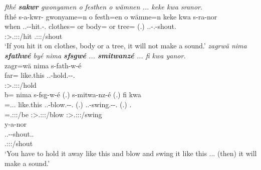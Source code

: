 \begin{exe}
\ex
\label{ex373}
\begin{xlist}
	\ex
	\emph{fthé \textbf{sakwr} gwonyamen o festhen o wämnen ... keke kwa sranor}.\\
	\glll fthé s-a-kwr-\Zero{} gwonyame=n o festh=en o wämne=n keke kwa s-ra-nor\\
	when \Tsg.\Masc.\Alph-\Ndu-hit.\Rs-\Ssg.\Imp{} clothes=\Loc{} or body=\Loc{} or tree=\Loc{} (.) \Neg{} \Fut{} \Tsg.\Masc.\Bet-\Irr.\Vc-shout.\Ext\\
	{} \footnotesize{\Fsg:\Sbj>\Tsg.\Masc:\Obj:\Imp:\Pfv/hit} {} {} {} {} {} {} {} {} \footnotesize{\Tsg.\Masc:\Sbj:\Irr:\Ipfv/shout}\\
	\trans `If you hit it on clothes, body or a tree, it will not make a sound.'
	\label{ex372}
	\ex
	\emph{zagrwä nima \textbf{sfathwé} byé nima \textbf{sfsgwé} ... \textbf{smitwanzé} ... fi kwa yanor.}\\
	\glll zagr=wä nima s-fath-w-é\\
	far=\Emph{} like.this \Tsg.\Masc.\Bet-hold.\Ext-\Ndu-\Ssg.\Imp{}\\
	{} {} \footnotesize{\Ssg:\Sbj>\Tsg.\Masc:\Obj:\Imp:\Ipfv/hold}\\
	\sn
	\glll b= nima s-fsg-w-é (.) s-mitwa-nz-é (.) fi kwa\\
	\Med=\Tsg.\Masc.\Cop.\Ndu{} like.this \Tsg.\Masc.\Bet-blow.\Ext-\Ndu-\Ssg.\Imp{} (.) \Tsg.\Masc.\Bet-swing.\Ext-\Ndu-\Ssg.\Imp{} (.) \Third.\Abs{} \Fut{}\\
	\footnotesize{\Med=\Tsg.\Masc:\Sbj:\Nonpast:\Ipfv/be} {} \footnotesize{\Ssg:\Sbj>\Tsg.\Masc:\Obj:\Imp:\Ipfv/blow} {} \footnotesize{\Ssg:\Sbj>\Tsg.\Masc:\Obj:\Imp:\Ipfv/swing} {} {} {}\\
	\sn
	\glll y-a-nor\\
	\Tsg.\Masc.\Alph-\Vc-shout.\Ext.\Ndu\\
	\footnotesize{\Tsg.\Masc:\Sbj:\Nonpast:\Ipfv/shout}\\
	\trans `You have to hold it away like this and blow and swing it like this ... (then) it will make a sound.'
	\label{ex371}
\end{xlist}
\end{exe}

